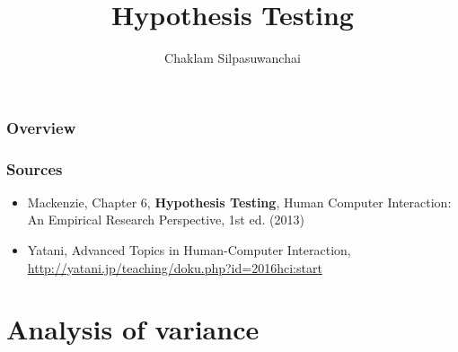 \documentclass{beamer}
\title[Hypothesis Testing]{Hypothesis Testing} %
\author{Chaklam Silpasuwanchai} %
\institute[AIT] %
{
Asian Institute of Technology \\ %
\medskip
\textit{chaklam@ait.asia} %
}
\date{} %
\begin{document}
\begin{frame}
\titlepage %
\end{frame}

\begin{frame}
\frametitle{Overview} %
\tableofcontents
\end{frame}


\begin{frame}
\frametitle{Sources} 
\begin{itemize}
	\item Mackenzie, Chapter 6, \textbf{Hypothesis Testing},  Human Computer Interaction: An Empirical Research Perspective, 1st ed. (2013) 
	\item Yatani, Advanced Topics in Human-Computer Interaction, \url{http://yatani.jp/teaching/doku.php?id=2016hci:start}
\end{itemize}
\end{frame}



\section{Analysis of variance} %
\end{document}
